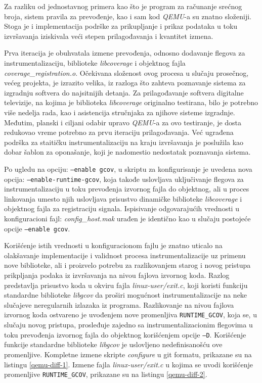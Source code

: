 \documentclass[12pt,oneside]{memoir}
\newcommand{\kod}[1]{\texttt{#1}}
\newcommand{\strano}[1]{\textit{#1}}
\begin{document}
Za razliku od jednostavnog primera kao što je program za računanje srećnog broja, sistem pravila za prevođenje, kao i sam kod \strano{QEMU}-a su znatno složeniji. Stoga je i implementacija podrške za prikupljanje i prikaz podataka u toku izvršavanja iziskivala veći stepen prilagođavanja i kvantitet izmena. 

Prva iteracija je obuhvatala izmene prevođenja, odnosno dodavanje flegova za instrumentalizaciju, biblioteke \strano{libcoverage} i objektnog fajla \strano{coverage\_registration.o}. 
Očekivana složenost ovog procesa u slučaju prosečnog, većeg projekta, je izrazito velika, iz razloga što zahteva poznavanje sistema za izgradnju softvera do najsitnijih detanja. Za prilagođavanje softvera digitalne televizije, na kojima je biblioteka \strano{libcoverage} originalno testirana, bilo je potrebno više nedelja rada, kao i asistencija stručnjaka za njihove sisteme izgradnje. Međutim, planski i ciljani odabir upravo \strano{QEMU}-a za ovo testiranje, je dosta redukovao vreme potrebno za prvu iteraciju prilagođavanja. Već ugrađena podrška za staitičku instrumentalizaciju na kraju izvršavanja je poslužila kao dobar šablon za oponašanje, koji je nadomestio nedostatak poznavanja sistema. 

Po ugledu na opciju: \kod{--enable gcov}, u skriptu za konfigurisanje je uvedena nova opcija: \kod{--enable-runtime-gcov}, koja takođe uslovljava uključivanje flegova za instrumentalizaciju u toku prevođenja izvornog fajla do objektnog, ali u proces linkovanja umesto njih uslovljava prisustvo dinamičke biblioteke \strano{libcoverage} i objektnog fajla za registraciju signala. Ispisivanje odgovarajućih vrednosti u konfiguracioni fajl: \strano{config\_host.mak} urađen je identično kao u slučaju postojeće opcije \kod{--enable gcov}. 

Korišćenje istih vrednosti u konfiguracionom fajlu je znatno uticalo na olakšavanje implementacije i validnost procesa instrumentalizacije uz primenu nove biblioteke, ali i proizvelo potrebu za razlikovanjem starog i novog pristupa prikpljanja podaka iz izvršavanja na nivou fajlova izvornog koda. Razlog predstavlja prisustvo koda u okviru fajla \strano{linux-user/exit.c}, koji koristi funkciju standardne biblioteke \strano{libgcov} da proširi mogućnost instrumentalizacije na neke slučajeve neregularnih izlazaka iz programa. Razlikovanje na nivou fajlova izvornog koda ostvareno je uvođenjem nove promenljiva \kod{RUNTIME\_GCOV}, koja se, u slučaju novog pristupa, prosleđuje zajedno sa instrumentalizacionim flegovima u toku prevođenja izvornog fajla do objektnog korišćenjem opcije \kod{–D}. Korišćenje funkcije standardne biblioteke \strano{libgcov} je uslovljeno nedefinisanošću ove promenljive. Kompletne izmene skripte \strano{configure} u git formatu, prikazane su na listingu \ref{qemu-diff-1}. Izmene fajla \strano{linux-user/exit.c} u kojima se uvodi korišćenje promenljive \kod{RUNTIME\_GCOV}, prikazane su na listingu \ref{qemu-diff-2}. \\
\end{document}
